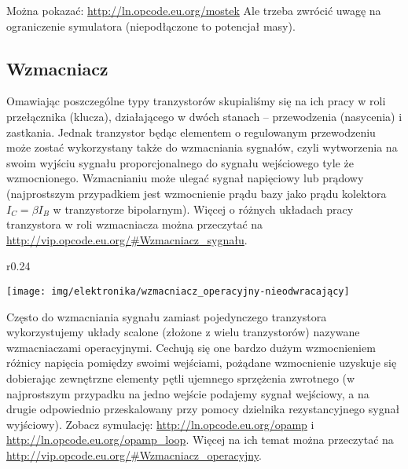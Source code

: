 \begin{teacherOnly}
Można pokazać: \url{http://ln.opcode.eu.org/mostek}
Ale trzeba zwrócić uwagę na ograniczenie symulatora (niepodłączone to potencjał masy).
\end{teacherOnly}

\subsection{Wzmacniacz}

Omawiając poszczególne typy tranzystorów skupialiśmy się na ich pracy w roli przełącznika (klucza), działającego w dwóch stanach – przewodzenia (nasycenia) i zastkania.
Jednak tranzystor będąc elementem o regulowanym przewodzeniu może zostać wykorzystany także do wzmacniania sygnałów, czyli wytworzenia na swoim wyjściu sygnału proporcjonalnego do sygnału wejściowego tyle że wzmocnionego.
Wzmacnianiu może ulegać sygnał napięciowy lub prądowy (najprostszym przypadkiem jest wzmocnienie prądu bazy jako prądu kolektora $I_C = \beta I_B$ w tranzystorze bipolarnym).
Więcej o różnych układach pracy tranzystora w roli wzmacniacza można przeczytać na \url{http://vip.opcode.eu.org/#Wzmacniacz_sygnału}.

\vspace{5pt}

\begin{wrapfigure}{r}{0.24\textwidth}
  \begin{center}
    \vspace{-25pt}
    \texttt{[image: img/elektronika/wzmacniacz\_operacyjny-nieodwracający]}
    \vspace{-47pt}
  \end{center}
\end{wrapfigure}

Często do wzmacniania sygnału zamiast pojedynczego tranzystora wykorzystujemy układy scalone (złożone z wielu tranzystorów) nazywane wzmacniaczami operacyjnymi.
Cechują się one bardzo dużym wzmocnieniem różnicy napięcia pomiędzy swoimi wejściami, pożądane wzmocnienie uzyskuje się dobierając zewnętrzne elementy pętli ujemnego sprzężenia zwrotnego
	(w najprostszym przypadku na jedno wejście podajemy sygnał wejściowy, a na drugie odpowiednio przeskalowany przy pomocy dzielnika rezystancyjnego sygnał wyjściowy).
Zobacz symulację: \url{http://ln.opcode.eu.org/opamp} i \url{http://ln.opcode.eu.org/opamp_loop}. Więcej na ich temat można przeczytać na \url{http://vip.opcode.eu.org/#Wzmacniacz_operacyjny}.

